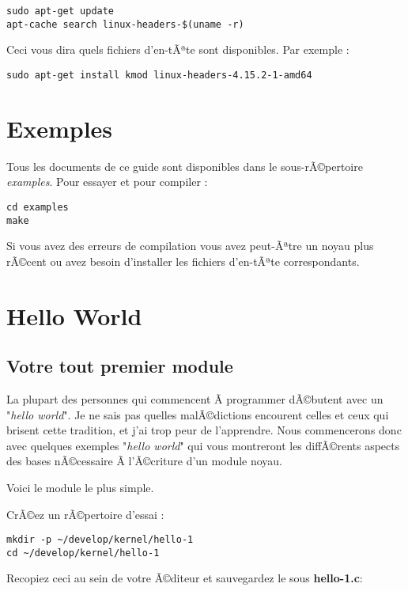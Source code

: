 \documentclass[11pt]{article}
\begin{document}
\begin{verbatim}
sudo apt-get update
apt-cache search linux-headers-$(uname -r)
\end{verbatim}

Ceci vous dira quels fichiers d'en-tÃªte sont disponibles. Par exemple :

\begin{verbatim}
sudo apt-get install kmod linux-headers-4.15.2-1-amd64
\end{verbatim}

\section*{Exemples}
\label{sec-3}

Tous les documents de ce guide sont disponibles dans le sous-rÃ©pertoire \emph{examples}. Pour essayer et pour compiler :

\begin{verbatim}
cd examples
make
\end{verbatim}

Si vous avez des erreurs de compilation vous avez peut-Ãªtre un noyau plus rÃ©cent ou avez besoin d'installer les fichiers d'en-tÃªte correspondants.

\section*{Hello World}
\label{sec-4}
\subsection*{Votre tout premier module}
\label{sec-4-1}

La plupart des personnes qui commencent Ã  programmer dÃ©butent avec un "\emph{hello world}". Je ne sais pas quelles malÃ©dictions encourent celles et ceux qui brisent cette tradition, et j'ai trop peur de l'apprendre. Nous commencerons donc avec quelques exemples "\emph{hello world}" qui vous montreront les diffÃ©rents aspects des bases nÃ©cessaire Ã  l'Ã©criture d'un module noyau.

Voici le module le plus simple.

CrÃ©ez un rÃ©pertoire d'essai :

\begin{verbatim}
mkdir -p ~/develop/kernel/hello-1
cd ~/develop/kernel/hello-1
\end{verbatim}

Recopiez ceci au sein de votre Ã©diteur et sauvegardez le sous \textbf{hello-1.c}:
\end{document}
